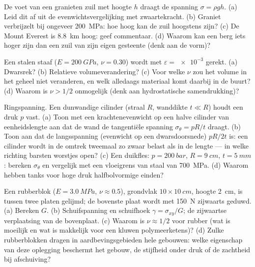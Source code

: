 \begin{exercise}[$\star$]\label{exo:b3:continuum-elasticity:3}
De voet van een granieten zuil met hoogte $h$ draagt de spanning $\sigma
= \rho gh$. (a) Leid dit af uit de evenwichtsvergelijking met
zwaartekracht. (b) Graniet verbrijzelt bij ongeveer \qty{200}{MPa}: hoe
hoog kan de zuil hoogstens zijn? (c) De Mount Everest is \qty{8.8}{km}
hoog: geef commentaar. (d) Waarom kan een berg iets hoger zijn dan een
zuil van zijn eigen gesteente (denk aan de vorm)?
\end{exercise}

\begin{exercise}[$\star$]\label{exo:b3:continuum-elasticity:4}
Een stalen staaf ($E = \qty{200}{GPa}$, $\nu = 0.30$) wordt met
$\varepsilon = \num{e-3}$ gerekt. (a) Dwarsrek? (b) Relatieve
volumeverandering? (c) Voor welke $\nu$ zou het volume in het geheel niet
veranderen, en welk alledaags materiaal komt daarbij in de buurt? (d)
Waarom is $\nu > 1/2$ onmogelijk (denk aan hydrostatische samendrukking)?
\end{exercise}

\begin{exercise}[$\star\star$]\label{exo:b3:continuum-elasticity:5}
Ringspanning. Een dunwandige cilinder (straal $R$, wanddikte $t \ll
R$)
houdt een druk $p$ vast. (a) Toon met een krachtenevenwicht op een halve
cilinder van eenheidslengte aan dat de wand de tangentiële spanning
$\sigma_\theta = pR/t$ draagt. (b) Toon aan dat de langsspanning
(evenwicht op een dwarsdoorsnede) $pR/2t$ is: een cilinder wordt in de
omtrek tweemaal zo zwaar belast als in de lengte --- in welke richting
barsten worstjes open? (c) Een duikfles: $p =
\qty{200}{bar}$, $R = \qty{9}{cm}$, $t = \qty{5}{mm}$: bereken $\sigma_\theta$ en vergelijk met
een vloeigrens van staal van \qty{700}{MPa}. (d) Waarom hebben tanks voor
hoge druk halfbolvormige einden?
\end{exercise}

\begin{exercise}[$\star\star$]\label{exo:b3:continuum-elasticity:6}
Een rubberblok ($E = \qty{3.0}{MPa}$, $\nu \approx 0.5$), grondvlak $10
\times \qty{10}{cm}$, hoogte \qty{2}{cm}, is tussen twee platen gelijmd;
de bovenste plaat wordt met \qty{150}{N} zijwaarts geduwd. (a) Bereken
$G$. (b) Schuifspanning en schuifhoek $\gamma = \sigma_{xy}/G$; de
zijwaartse verplaatsing van de bovenplaat. (c) Waarom is $\nu \approx 1/2$ voor rubber (wat is moeilijk en wat is makkelijk voor een kluwen
polymeerketens)? (d) Zulke rubberblokken dragen in aardbevingsgebieden
hele gebouwen: welke eigenschap van deze oplegging beschermt het gebouw,
de stijfheid onder druk of de zachtheid bij afschuiving?
\end{exercise}

